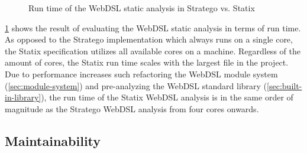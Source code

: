     \begin{figure}
      \analysisbenchmarkresults
      \caption{\label{fig:analysis-performance-charts}Run time of the WebDSL static analysis in Stratego vs. Statix}
    \end{figure}

    \cref{fig:analysis-performance-charts} shows the result of evaluating the WebDSL static analysis in terms of run time. As opposed to the Stratego implementation which always runs on a single core, the Statix specification utilizes all available cores on a machine. Regardless of the amount of cores, the Statix run time scales with the largest file in the project. Due to performance increases such refactoring the WebDSL module system (\cref{sec:module-system}) and pre-analyzing the WebDSL standard library (\cref{sec:built-in-library}), the run time of the Statix WebDSL analysis is in the same order of magnitude as the Stratego WebDSL analysis from four cores onwards.

  \subsection{Maintainability}

